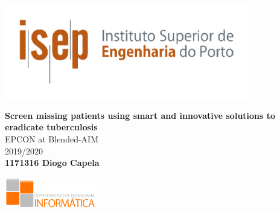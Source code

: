 
\thispagestyle{empty}

\begin{titlepage}
		\begin{center}
	
		\vspace*{2.5cm}
		\includegraphics[width=0.8\textwidth]{images/isep.pdf}

		\vspace{4.0cm}
	
		\Large{\textbf{Screen missing patients using smart and innovative solutions to eradicate tuberculosis}}\\
			
		\normalsize
		EPCON at Blended-AIM\\
		\large
		 \vspace{0.5cm}
		2019/2020\\
		
		\vspace{1.0cm}
		\normalsize \textbf{1171316 Diogo Capela} \\
			
		\normalsize

		\vspace*{2.8cm}
		\tiny{\includegraphics[width=0.3\textwidth]{images/dei.pdf}}
		
	\end{center}
\end{titlepage}
